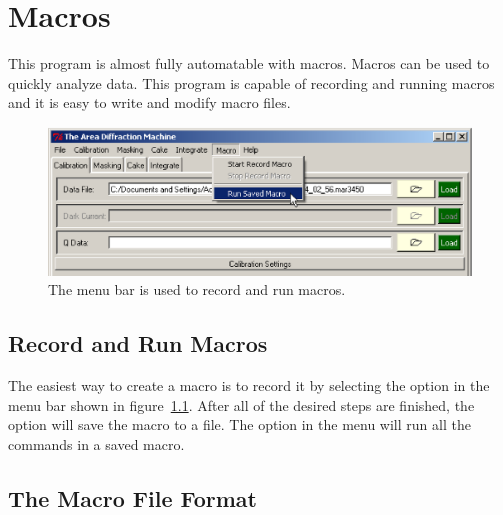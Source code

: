 \chapter{Macros}

This program is almost fully automatable with macros. Macros
can be used to quickly analyze data. 
This program is capable of recording and running macros and
it is easy to write and modify macro files. 

\begin{figure}
    \centering
    \includegraphics[scale=.75]{figures/macro.eps}
    \caption{The  menu bar is used to
    record and run macros.}
    \label{macro_figure}
\end{figure}

\section{Record and Run Macros}

The easiest way to create a macro is to record it by selecting 
the  
option in the  menu 
bar shown in  figure~\ref{macro_figure}. 
After all of the desired steps are finished, 
the  option will save the macro to
a file. The  option in the 
menu will run all the commands in a saved macro. 

\section{The Macro File Format}

